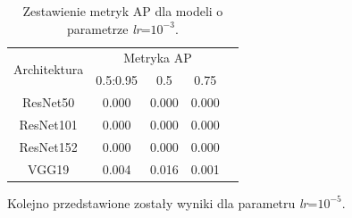 \begin{table}[H]
    \centering
    \caption{Zestawienie metryk AP dla modeli o parametrze \emph{lr}=$10^{-3}$.}
    \begin{tabular}{|c||c|c|c|c|}
    \hline
        \multirow{2}{*}{Architektura}&\multicolumn{3}{c|}{Metryka AP}\\ \cline{2-4}
         & 0.5:0.95&0.5&0.75\\ \hline \hline
        ResNet50 & 0.000 & 0.000 & 0.000 \\ \hline
        ResNet101 & 0.000 & 0.000 & 0.000 \\ \hline
        ResNet152 & 0.000 & 0.000 & 0.000 \\ \hline
        VGG19 & 0.004 & 0.016 & 0.001 \\ \hline
    \end{tabular}
    \label{tab:ap_lr3}
\end{table}

\hspace{0.5cm}
Kolejno przedstawione zostały wyniki dla parametru \emph{lr}=$10^{-5}$.

